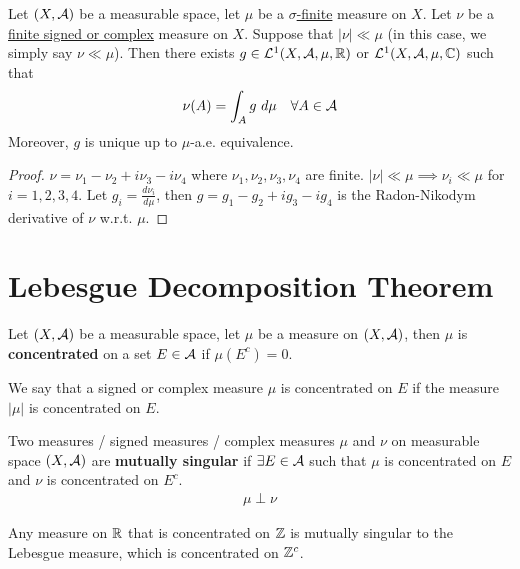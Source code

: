 \documentclass[11pt]{article}
\newcommand{\dmu}[0]{\ d\mu}
\begin{document}
	\begin{theorem}
		Let $(X, \mathcal{{A}})$ be a measurable space, let $\mu$ be a \ul{$\sigma$-finite} measure on $X$. Let $\nu$ be a \ul{finite signed or complex} measure on $X$. Suppose that $|\nu| \ll \mu$ (in this case, we simply say $\nu \ll \mu$). Then there exists $g \in \mathcal{{L}}^1(X, \mathcal{{A}}, \mu, \mathbb{R})$ or $\mathcal{{L}}^1(X, \mathcal{{A}}, \mu, \mathbb{C})$ such that
		\begin{align}
			\nu(A) = \int_A g\dmu\quad \forall A \in \mc{A}
		\end{align}
		Moreover, $g$ is unique up to $\mu$-a.e. equivalence.
		\begin{proof}
			$\nu = \nu_1 - \nu_2 + i \nu_3 - i \nu_4$ where $\nu_1, \nu_2, \nu_3, \nu_4$ are finite. $|\nu| \ll \mu \implies \nu_i \ll \mu$ for $i = 1,2,3,4$. Let $g_i = \frac{d\nu_i}{d\mu}$, then $g = g_1 - g_2 + i g_3 - i g_4$ is the Radon-Nikodym derivative of $\nu$ w.r.t. $\mu$.
		\end{proof}
	\end{theorem}
	
	\newpage
	\section{Lebesgue Decomposition Theorem}
	\begin{definition}
		Let $(X, \mathcal{{A}})$ be a measurable space, let $\mu$ be a measure on $(X, \mathcal{{A}})$, then $\mu$ is \textbf{concentrated} on a set $E \in \mathcal{{A}}$ if $\mu(E^c) = 0$.
		
		We say that a signed or complex measure $\mu$ is concentrated on $E$ if the measure $|\mu|$ is concentrated on $E$.
	\end{definition}
	
	\begin{definition}
		Two measures / signed measures / complex measures $\mu$ and $\nu$ on measurable space $(X, \mathcal{{A}})$ are \textbf{mutually singular} if $\exists E \in \mathcal{{A}}$ such that $\mu$ is concentrated on $E$ and $\nu$ is concentrated on $E^c$.
		\begin{align}
			\mu \perp \nu
		\end{align}
	\end{definition}
	
	\begin{example}
		Any measure on $\mathbb{R}$ that is concentrated on $\mathbb{Z}$ is mutually singular to the Lebesgue measure, which is concentrated on $\mathbb{Z}^c$.
	\end{example}
	
\end{document}
